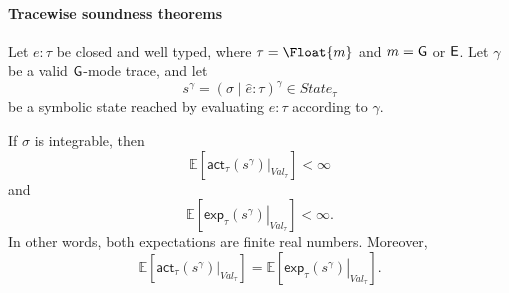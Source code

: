 \paragraph{Tracewise soundness theorems}
\begin{theorem}
  \label{thm:tracewise-agreement-of-interpretations}
  Let $e:\tau$ be closed and well typed, where
  $\tau=\Float{m}$ and $m=\mathsf{G}$ or $\mathsf{E}$. Let $\gamma$ be a valid $\mathsf{G}$-mode trace, and let 
  \[
    s^\gamma
    =
    (\sigma\mid\hat e:\tau)^\gamma
    \in State_\tau
  \]
  be a symbolic state reached by evaluating $e : \tau$ according to $\gamma$.

  If $\sigma$ is integrable, then
  \[
    \mathbb E\!\left[
        \left.\mathsf{act}_\tau(s^\gamma)\right|_{Val_\tau}
    \right]
    <
    \infty
  \]
  and
  \[
    \mathbb E\!\left[
        \left.\mathsf{exp}_\tau(s^\gamma)\right|_{Val_\tau}
    \right]
    <
    \infty.
  \]
  In other words, both expectations are finite real numbers. Moreover,
  \[
    \mathbb E\!\left[
      \left.\mathsf{act}_\tau(s^\gamma)\right|_{Val_\tau}
    \right]
    =
    \mathbb E\!\left[
      \left.\mathsf{exp}_\tau(s^\gamma)\right|_{Val_\tau}
    \right].
  \]
\end{theorem}

